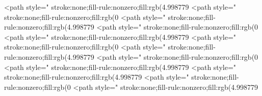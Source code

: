 <path style=" stroke:none;fill-rule:nonzero;fill:rgb(4.998779%
<path style=" stroke:none;fill-rule:nonzero;fill:rgb(0%
<path style=" stroke:none;fill-rule:nonzero;fill:rgb(4.998779%
<path style=" stroke:none;fill-rule:nonzero;fill:rgb(0%
<path style=" stroke:none;fill-rule:nonzero;fill:rgb(4.998779%
<path style=" stroke:none;fill-rule:nonzero;fill:rgb(0%
<path style=" stroke:none;fill-rule:nonzero;fill:rgb(4.998779%
<path style=" stroke:none;fill-rule:nonzero;fill:rgb(0%
<path style=" stroke:none;fill-rule:nonzero;fill:rgb(4.998779%
<path style=" stroke:none;fill-rule:nonzero;fill:rgb(4.998779%
<path style=" stroke:none;fill-rule:nonzero;fill:rgb(0%
<path style=" stroke:none;fill-rule:nonzero;fill:rgb(4.998779%
